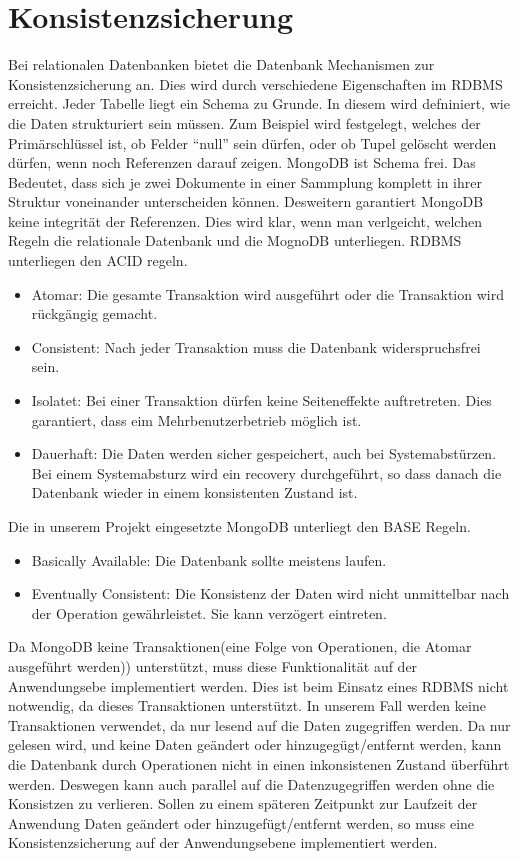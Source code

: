  \section{Konsistenzsicherung}
 Bei relationalen Datenbanken bietet die Datenbank Mechanismen zur
 Konsistenzsicherung an. Dies wird durch verschiedene Eigenschaften im RDBMS
 erreicht. Jeder Tabelle liegt ein Schema zu Grunde. In diesem wird defniniert,
 wie die Daten strukturiert sein müssen. Zum Beispiel wird festgelegt, welches
 der Primärschlüssel ist, ob Felder ``null'' sein dürfen, oder ob Tupel gelöscht
 werden dürfen, wenn noch Referenzen darauf zeigen.
 MongoDB ist Schema frei. Das Bedeutet, dass sich je zwei Dokumente in einer
Sammplung  komplett in ihrer Struktur voneinander unterscheiden können.
 Desweitern garantiert MongoDB keine integrität der Referenzen. Dies wird klar,
 wenn man verlgeicht, welchen Regeln die relationale Datenbank und die MognoDB
 unterliegen.
 RDBMS unterliegen den ACID regeln. 
 \begin{itemize}
   \item Atomar: Die gesamte Transaktion wird ausgeführt oder die Transaktion
   wird rückgängig gemacht.
   \item Consistent: Nach jeder Transaktion muss die Datenbank widerspruchsfrei
   sein.
   \item Isolatet: Bei einer Transaktion dürfen keine Seiteneffekte
   auftretreten. Dies garantiert, dass eim Mehrbenutzerbetrieb möglich ist.
   \item Dauerhaft: Die Daten werden sicher gespeichert, auch bei
   Systemabstürzen. Bei einem Systemabsturz wird ein recovery durchgeführt, so 
   dass danach die Datenbank wieder in einem konsistenten Zustand ist.
 \end{itemize}
 Die in unserem Projekt eingesetzte MongoDB unterliegt den BASE Regeln.
 \begin{itemize}
   \item Basically Available: Die Datenbank sollte meistens laufen.
   \item Eventually Consistent: Die Konsistenz der Daten wird nicht unmittelbar
   nach der Operation gewährleistet. Sie kann verzögert eintreten.
\end{itemize}
Da MongoDB keine Transaktionen(eine Folge von Operationen, die Atomar
ausgeführt werden)) unterstützt, muss diese Funktionalität auf der
Anwendungsebe implementiert werden. Dies ist beim Einsatz eines RDBMS nicht notwendig,
da dieses Transaktionen unterstützt. In unserem Fall werden keine
Transaktionen verwendet, da nur lesend auf die Daten zugegriffen werden.
Da nur gelesen wird, und keine Daten geändert oder hinzugegügt/entfernt werden,
kann die Datenbank durch Operationen nicht in einen inkonsistenen Zustand
überführt werden. Deswegen kann auch parallel auf die Datenzugegriffen
werden ohne die Konsistzen zu verlieren. Sollen zu einem späteren Zeitpunkt zur
Laufzeit der Anwendung Daten geändert oder hinzugefügt/entfernt werden,
 so muss eine Konsistenzsicherung auf der Anwendungsebene  implementiert werden.


 

		